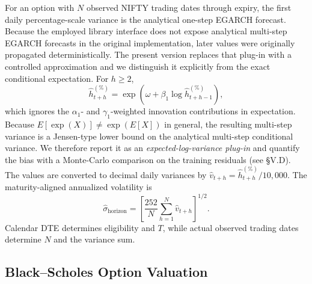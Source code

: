 \documentclass[journal]{IEEEtran}
\begin{document}
%
%
For an option with $N$ observed NIFTY trading dates through expiry, the first daily percentage-scale variance is the analytical one-step EGARCH forecast. Because the employed library interface does not expose analytical multi-step EGARCH forecasts in the original implementation, later values were originally propagated deterministically. The present version replaces that plug-in with a controlled approximation and we distinguish it explicitly from the exact conditional expectation. For $h\ge 2$,
\begin{equation}
\widehat h^{(\%)}_{t+h}=\exp\left(\omega+\beta_1\log\widehat h^{(\%)}_{t+h-1}\right),
\end{equation}
which ignores the $\alpha_1$- and $\gamma_1$-weighted innovation contributions in expectation. Because $E[\exp(X)]\neq\exp(E[X])$ in general, the resulting multi-step variance is a Jensen-type lower bound on the analytical multi-step conditional variance. We therefore report it as an \emph{expected-log-variance plug-in} and quantify the bias with a Monte-Carlo comparison on the training residuals (see §V.D). The values are converted to decimal daily variances by $\widehat v_{t+h}=\widehat h^{(\%)}_{t+h}/10{,}000$. The maturity-aligned annualized volatility is
\begin{equation}
\widehat\sigma_{\mathrm{horizon}}=\left[\frac{252}{N}\sum_{h=1}^{N}\widehat v_{t+h}\right]^{1/2}.
\end{equation}
Calendar DTE determines eligibility and $T$, while actual observed trading dates determine $N$ and the variance sum.

\subsection{Black--Scholes Option Valuation}
\end{document}
